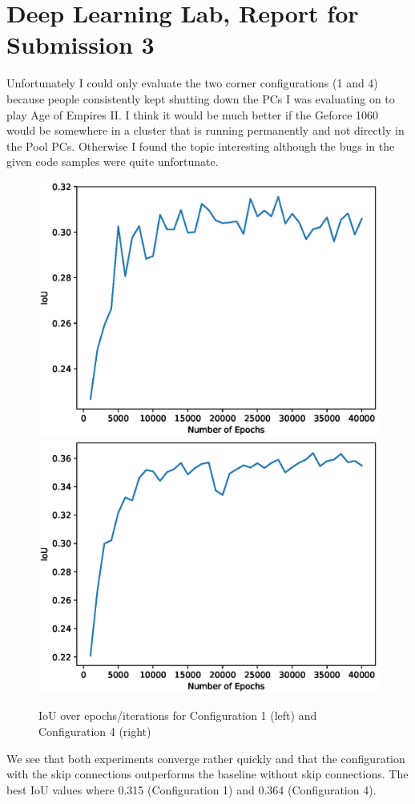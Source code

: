 \documentclass{scrartcl}
\begin{document}
\section*{Deep Learning Lab, Report for Submission 3}
Unfortunately I could only evaluate the two corner configurations (1 and 4) because people consistently kept shutting down the PCs I was evaluating on to play Age of Empires II. I think it would be much better if the Geforce 1060 would be somewhere in a cluster that is running permanently and not directly in the Pool PCs.
Otherwise I found the topic interesting although the bugs in the given code samples were quite unfortunate.
\begin{figure}[h!]
	\includegraphics[scale=0.5]{results/conf1.eps}
	\includegraphics[scale=0.5]{results/conf4.eps}
	\caption{IoU over epochs/iterations for Configuration 1 (left) and Configuration 4 (right)}
\end{figure}
We see that both experiments converge rather quickly and that the configuration with the skip connections outperforms the baseline without skip connections. The best IoU values where 0.315 (Configuration 1) and 0.364 (Configuration 4).
\end{document}
